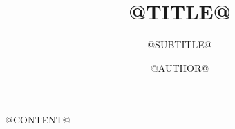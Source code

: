 \documentclass[12pt, a4paper]{scrartcl}
\title{@TITLE@}
\subtitle{@SUBTITLE@}
\author{@AUTHOR@}
\date{}
\begin{document}
	\maketitle
	\tableofcontents
	@CONTENT@
\end{document}
